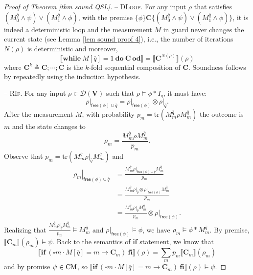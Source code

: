 \documentclass[conference,compsoc, 10pt]{IEEEtran}
\newcommand {\qbar} {{\overline{q}}}
\newcommand {\cD } {{\mathcal{D}}}
\newcommand {\id } {{I}}
\newcommand {\free }[1] {{\mathsf{free}\left(#1\right)}}
\newcommand {\rt }[2] {{\left.{#1}\right|_{#2}}}
\newcommand {\tr } {{\mathrm{tr}}}
\newcommand {\vars } {\mathbf{V}}
\newcommand {\prog } {{\mathbf{C}}}
\newcommand {\sem}[1] {\llbracket#1\rrbracket}
\begin{document}
\begin{appendices}
\begin{proof}[Proof of Theorem \ref{thm sound QSL}]
			\noindent -- \textsc{DLoop}. For any input $\rho$ that satisfies $(M_0^{\qbar}\wedge \psi)\vee (M_1^{\qbar}\wedge \phi)$, with the premise $\{\phi\}\prog\{(M_0^{\qbar}\wedge \psi)\vee (M_1^{\qbar}\wedge \phi)\}$, it is indeed a deterministic loop and the measurement $M$ in guard never changes the current state (see Lemma \ref{lem sound proof 4}), i.e., the number of iterations $N(\rho)$ is deterministic and moreover,
			$$\sem{\mathbf{while}\ M[\qbar]=1\ \mathbf{do}\ \prog\ \mathbf{od}} = \sem{\prog^{N(\rho)}}(\rho)$$
			where $\prog^k \triangleq \prog;\cdots;\prog$ is the $k$-fold sequential composition of $\prog$. Soundness follows by repeatedly using the induction hypothesis.
			
			
			\vspace{0.4cm}
			
			\noindent -- \textsc{RIf}. For any input $\rho\in\cD(\vars)$ such that $\rho\models\phi\ast\id_\qbar$, it must have:
			$$\rt{\rho}{\free{\phi}\cup\qbar} = \rt{\rho}{\free{\phi}}\otimes\rt{\rho}{\qbar}.$$
			After the measurement $M$, 
			with probability $p_m = \tr(M_m^\qbar\rho M_m^\qbar)$ the outcome is $m$ and the state changes to 
			$$\rho_m = \frac{M_m^\qbar\rho M_m^\qbar}{p_m}.$$ Observe that $p_m = \tr(M_m^\qbar\rt{\rho}{\qbar} M_m^\qbar)$ and 
			\begin{align*}
			\rt{\rho_m}{\free{\phi}\cup\qbar} &= \frac{M_m^\qbar\rt{\rho}{\free{\phi}\cup\qbar} M_m^\qbar}{p_m} \\
			&= \frac{M_m^\qbar\rt{\rho}{\qbar}\otimes\rt{\rho}{\free{\phi}} M_m^\qbar}{p_m} \\
			&= \frac{M_m^\qbar\rt{\rho}{\qbar} M_m^\qbar}{p_m}\otimes\rt{\rho}{\free{\phi}}.
			\end{align*}
			Realizing that $\frac{M_m^\qbar\rt{\rho}{\qbar} M_m^\qbar}{p_m}\models M_m^\qbar$ and $\rt{\rho}{\free{\phi}}\models \phi$, we have $\rho_m\models\phi\ast M_m^\qbar$. By premise, $\sem{\prog_m}(\rho_m)\models\psi$. Back to the semantics of {\bf if} statement, we know that
			$$\sem{\mathbf{if}\ (\square m\cdot M[\qbar] = m \rightarrow \prog_m )\ \mathbf{fi}}(\rho) = \sum_mp_m\sem{\prog_m}(\rho_m)$$
			and by promise $\psi\in{\rm CM}$, so $\sem{\mathbf{if}\ (\square m\cdot M[\qbar] = m \rightarrow \prog_m )\ \mathbf{fi}}(\rho) \models\psi$. 
			
			\vspace{0.4cm}
			

\end{proof}
\end{appendices}
\end{document}
